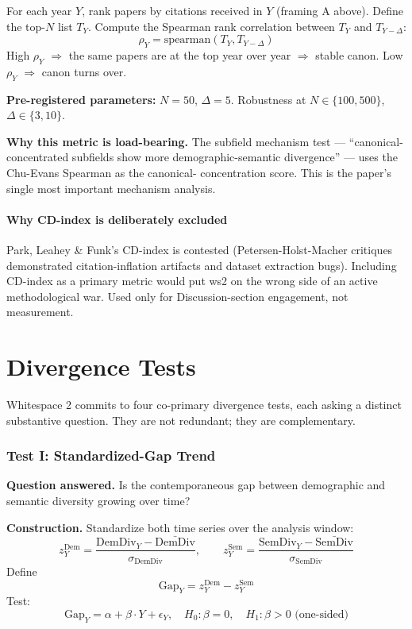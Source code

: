 \documentclass[11pt]{article}
\begin{document}
For each year $Y$, rank papers by citations received in $Y$ (framing A
above). Define the top-$N$ list $T_Y$. Compute the Spearman rank
correlation between $T_Y$ and $T_{Y-\Delta}$:
\[
  \rho_Y = \text{spearman}(T_Y, T_{Y-\Delta})
\]
High $\rho_Y$ $\Rightarrow$ the same papers are at the top year over
year $\Rightarrow$ stable canon. Low $\rho_Y$ $\Rightarrow$ canon
turns over.

\textbf{Pre-registered parameters:} $N = 50$, $\Delta = 5$. Robustness
at $N \in \{100, 500\}$, $\Delta \in \{3, 10\}$.

\textbf{Why this metric is load-bearing.} The subfield mechanism test
--- ``canonical-concentrated subfields show more demographic-semantic
divergence'' --- uses the Chu-Evans Spearman as the canonical-
concentration score. This is the paper's single most important mechanism
analysis.

\subsection{Why CD-index is deliberately excluded}

Park, Leahey \& Funk's CD-index is contested (Petersen-Holst-Macher
critiques demonstrated citation-inflation artifacts and dataset
extraction bugs). Including CD-index as a primary metric would put
ws2 on the wrong side of an active methodological war. Used only for
Discussion-section engagement, not measurement.

\clearpage
\part{Divergence Tests}

Whitespace 2 commits to four co-primary divergence tests, each asking
a distinct substantive question. They are not redundant; they are
complementary.

\section{Test I: Standardized-Gap Trend}
\label{sec:test-i}

\textbf{Question answered.} Is the contemporaneous gap between
demographic and semantic diversity growing over time?

\textbf{Construction.} Standardize both time series over the analysis
window:
\[
  z^{\text{Dem}}_Y = \frac{\text{DemDiv}_Y - \bar{\text{DemDiv}}}
  {\sigma_{\text{DemDiv}}},
  \qquad
  z^{\text{Sem}}_Y = \frac{\text{SemDiv}_Y - \bar{\text{SemDiv}}}
  {\sigma_{\text{SemDiv}}}
\]
Define
\[
  \text{Gap}_Y = z^{\text{Dem}}_Y - z^{\text{Sem}}_Y
\]
Test:
\[
  \text{Gap}_Y = \alpha + \beta \cdot Y + \epsilon_Y,
  \quad H_0: \beta = 0,
  \quad H_1: \beta > 0 \text{ (one-sided)}
\]
\end{document}
